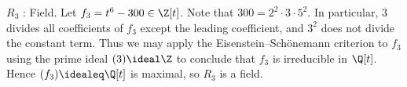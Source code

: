 {$R_{3}$ : Field. Let $f_{3} = t^{6} - 300 \in \Z[t]$. Note that $300 = 2^{2} \cdot 3 \cdot 5^{2}$. In particular, $3$ divides all coefficients of $f_{3}$ except the leading coefficient, and $3^{2}$ does not divide the constant term. Thus we may apply the Eisenstein--Sch\"{o}nemann criterion to $f_{3}$ using the prime ideal $(3) \ideal \Z$ to conclude that $f_{3}$ is irreducible in $\Q[t]$. Hence $(f_{3}) \idealeq \Q[t]$ is maximal, so $R_{3}$ is a field.}%